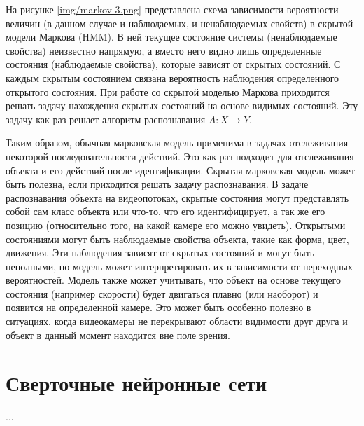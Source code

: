 

На рисунке \ref{img/markov-3.png} представлена схема зависимости вероятности величин (в данном случае и наблюдаемых, и ненаблюдаемых свойств) в скрытой модели Маркова (HMM). В ней текущее состояние системы (ненаблюдаемые свойства) неизвестно напрямую, а вместо него видно лишь определенные состояния (наблюдаемые свойства), которые зависят от скрытых состояний. С каждым скрытым состоянием связана вероятность наблюдения определенного открытого состояния. При работе со скрытой моделью Маркова приходится решать задачу нахождения скрытых состояний на основе видимых состояний. Эту задачу как раз решает алгоритм распознавания $A: X \rightarrow Y$.

Таким образом, обычная марковская модель применима в задачах отслеживания некоторой последовательности действий. Это как раз подходит для отслеживания объекта и его действий после идентификации. Скрытая марковская модель может быть полезна, если приходится решать задачу распознавания. В задаче распознавания объекта на видеопотоках, скрытые состояния могут представлять собой сам класс объекта или что-то, что его идентифицирует, а так же его позицию (относительно того, на какой камере его можно увидеть). Открытыми состояниями могут быть наблюдаемые свойства объекта, такие как форма, цвет, движения. Эти наблюдения зависят от скрытых состояний и могут быть неполными, но модель может интерпретировать их в зависимости от переходных вероятностей. Модель также может учитывать, что объект на основе текущего состояния (например скорости) будет двигаться плавно (или наоборот) и появится на определенной камере. Это может быть особенно полезно в ситуациях, когда видеокамеры не перекрывают области видимости друг друга и объект в данный момент находится вне поле зрения.

\chapter{Сверточные нейронные сети}
...

\renewcommand\bibname{СПИСОК ИСПОЛЬЗОВАННЫХ ИСТОЧНИКОВ}





